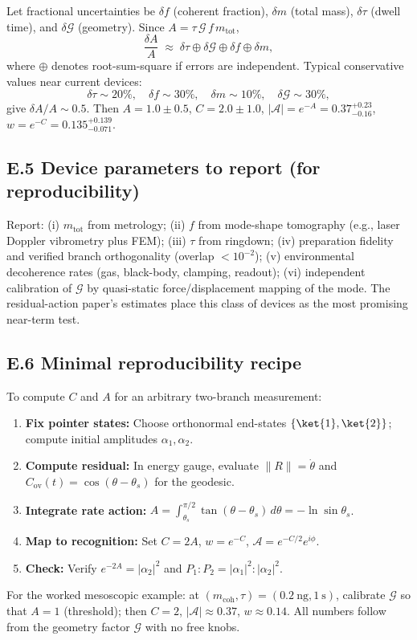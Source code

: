 \documentclass[11pt,letterpaper]{article}
\theoremstyle{definition}
\begin{document}
Let fractional uncertainties be \(\delta f\) (coherent fraction), \(\delta m\) (total mass), \(\delta\tau\) (dwell time), and \(\delta\mathcal G\) (geometry). Since \(A=\tau\,\mathcal G\,f\,m_{\mathrm{tot}}\),
\[
\frac{\delta A}{A}\;\approx\;\delta\tau\oplus\delta\mathcal G\oplus\delta f\oplus\delta m,
\]
where \(\oplus\) denotes root-sum-square if errors are independent. Typical conservative values near current devices:
\[
\delta\tau\sim 20\%,\quad \delta f\sim 30\%,\quad \delta m\sim 10\%,\quad \delta\mathcal G\sim 30\%,
\]
give \(\delta A/A\sim 0.5\). Then \(A=1.0\pm 0.5\), \(C=2.0\pm 1.0\), \(|\mathcal A|=e^{-A}=0.37^{+0.23}_{-0.16}\), \(w=e^{-C}=0.135^{+0.139}_{-0.071}\).

\subsection*{E.5 Device parameters to report (for reproducibility)}

Report: (i) \(m_{\mathrm{tot}}\) from metrology; (ii) \(f\) from mode-shape tomography (e.g., laser Doppler vibrometry plus FEM); (iii) \(\tau\) from ringdown; (iv) preparation fidelity and verified branch orthogonality (overlap \(<10^{-2}\)); (v) environmental decoherence rates (gas, black-body, clamping, readout); (vi) independent calibration of \(\mathcal G\) by quasi-static force/displacement mapping of the mode. The residual-action paper's estimates place this class of devices as the most promising near-term test.

\subsection*{E.6 Minimal reproducibility recipe}

To compute $C$ and $A$ for an arbitrary two-branch measurement:

\begin{enumerate}
  \item \textbf{Fix pointer states:} Choose orthonormal end-states $\{\ket{1},\ket{2}\}$; compute initial amplitudes $\alpha_1,\alpha_2$.
  \item \textbf{Compute residual:} In energy gauge, evaluate $\|R\|=\dot\theta$ and $C_{\mathrm{ov}}(t)=\cos(\theta-\theta_s)$ for the geodesic.
  \item \textbf{Integrate rate action:} $A=\int_{\theta_s}^{\pi/2}\tan(\theta-\theta_s)\,d\theta=-\ln\sin\theta_s$.
  \item \textbf{Map to recognition:} Set $C=2A$, $w=e^{-C}$, $\mathcal A=e^{-C/2}e^{i\phi}$.
  \item \textbf{Check:} Verify $e^{-2A}=|\alpha_2|^2$ and $P_1:P_2=|\alpha_1|^2:|\alpha_2|^2$.
\end{enumerate}

For the worked mesoscopic example: at $(m_{\mathrm{coh}},\tau)=(0.2~\mathrm{ng}, 1~\mathrm{s})$, calibrate $\mathcal G$ so that $A=1$ (threshold); then $C=2$, $|\mathcal A|\approx 0.37$, $w\approx 0.14$. All numbers follow from the geometry factor $\mathcal G$ with no free knobs.

\medskip
\end{document}
